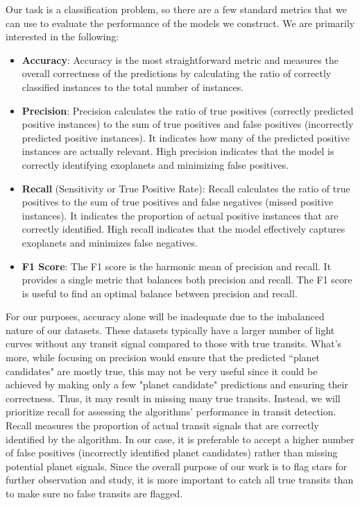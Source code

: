 \documentclass{article}
\begin{document}
Our task is a classification problem, so there are a few standard metrics that we can use to evaluate the performance of the models we construct. We are primarily interested in the following: 
\begin{itemize}
\item \textbf{Accuracy}: Accuracy is the most straightforward metric and measures the overall correctness of the predictions by calculating the ratio of correctly classified instances to the total number of instances.
\item \textbf{Precision}: Precision calculates the ratio of true positives (correctly predicted positive instances) to the sum of true positives and false positives (incorrectly predicted positive instances). It indicates how many of the predicted positive instances are actually relevant. High precision indicates that the model is correctly identifying exoplanets and minimizing false positives.
\item \textbf{Recall} (Sensitivity or True Positive Rate): Recall calculates the ratio of true positives to the sum of true positives and false negatives (missed positive instances). It indicates the proportion of actual positive instances that are correctly identified. High recall indicates that the model effectively captures exoplanets and minimizes false negatives.
\item \textbf{F1 Score}: The F1 score is the harmonic mean of precision and recall. It provides a single metric that balances both precision and recall. The F1 score is useful to find an optimal balance between precision and recall.
\end{itemize}

For our purposes, accuracy alone will be inadequate due to the imbalanced nature of our datasets. These datasets typically have a larger number of light curves without any transit signal compared to those with true transits. What's more, while focusing on precision would ensure that the predicted ``planet candidates" are mostly true, this may not be very useful since it could be achieved by making only a few "planet candidate" predictions and ensuring their correctness. Thus, it may result in missing many true transits. Instead, we will prioritize recall for assessing the algorithms' performance in transit detection. Recall measures the proportion of actual transit signals that are correctly identified by the algorithm. In our case, it is preferable to accept a higher number of false positives (incorrectly identified planet candidates) rather than missing potential planet signals. Since the overall purpose of our work is to flag stars for further observation and study, it is more important to catch all true transits than to make sure no false transits are flagged. 
\end{document}

